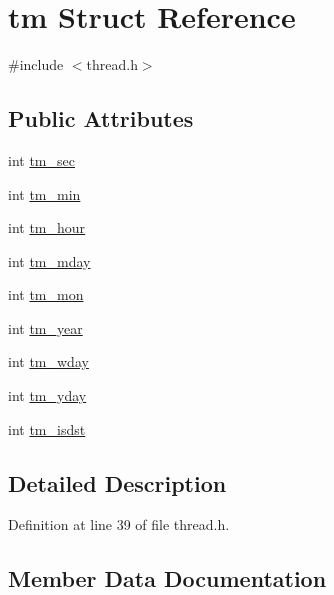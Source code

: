 \hypertarget{structtm}{}\section{tm Struct Reference}
\label{structtm}


{\ttfamily \#include $<$thread.\+h$>$}

\subsection*{Public Attributes}
\begin{DoxyCompactItemize}
\item 
int \mbox{\hyperlink{structtm_a4d098a9a5c03a00b2ee61e10851de81e}{tm\+\_\+sec}}
\item 
int \mbox{\hyperlink{structtm_af414eb7c86cc3099595211eee4d4211b}{tm\+\_\+min}}
\item 
int \mbox{\hyperlink{structtm_a3e7ca4e37f1abcaf56b8a916c38eb9fe}{tm\+\_\+hour}}
\item 
int \mbox{\hyperlink{structtm_ab8d8904bad43b0c8b96e61941c5b5310}{tm\+\_\+mday}}
\item 
int \mbox{\hyperlink{structtm_a112ac36fa2f593777138a417cf031e17}{tm\+\_\+mon}}
\item 
int \mbox{\hyperlink{structtm_a33adf78fd6476b2120ce3b9c4a852053}{tm\+\_\+year}}
\item 
int \mbox{\hyperlink{structtm_afe81a8c46f1c693c43f259b288859f4f}{tm\+\_\+wday}}
\item 
int \mbox{\hyperlink{structtm_a93a0ba77cc23796df84405dcbcc57eb1}{tm\+\_\+yday}}
\item 
int \mbox{\hyperlink{structtm_a5645ca0580c8ab2c24f6c2965d9c9f9c}{tm\+\_\+isdst}}
\end{DoxyCompactItemize}


\subsection{Detailed Description}


Definition at line 39 of file thread.\+h.



\subsection{Member Data Documentation}
\mbox{\label{structtm_a3e7ca4e37f1abcaf56b8a916c38eb9fe}} 

